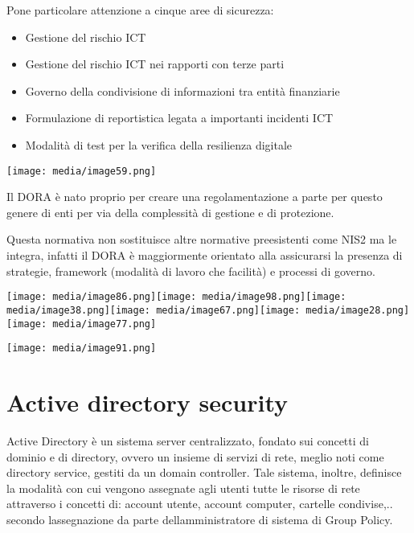 Pone particolare attenzione a cinque aree di sicurezza:

\begin{itemize}
\item
  Gestione del rischio ICT
\item
  Gestione del rischio ICT nei rapporti con terze parti
\item
  Governo della condivisione di informazioni tra entità finanziarie
\item
  Formulazione di reportistica legata a importanti incidenti ICT
\item
  Modalità di test per la verifica della resilienza digitale
\end{itemize}

\texttt{[image: media/image59.png]}

Il DORA è nato proprio per creare una regolamentazione a parte per
questo genere di enti per via della complessità di gestione e di
protezione.

Questa normativa non sostituisce altre normative preesistenti come NIS2
ma le integra, infatti il DORA è maggiormente orientato alla assicurarsi
la presenza di strategie, framework (modalità di lavoro che facilità) e
processi di governo.

\texttt{[image: media/image86.png]}\texttt{[image: media/image98.png]}\texttt{[image: media/image38.png]}\texttt{[image: media/image67.png]}\texttt{[image: media/image28.png]}\texttt{[image: media/image77.png]}

\texttt{[image: media/image91.png]}

\section{Active directory security}\label{active-directory-security}

Active Directory è un sistema server centralizzato, fondato sui concetti
di dominio e di directory, ovvero un insieme di servizi di rete, meglio
noti come directory service, gestiti da un domain controller. Tale
sistema, inoltre, definisce la modalità con cui vengono assegnate agli
utenti tutte le risorse di rete attraverso i concetti di: account
utente, account computer, cartelle condivise,.. secondo
l\textquotesingle assegnazione da parte
dell\textquotesingle amministratore di sistema di Group Policy.

